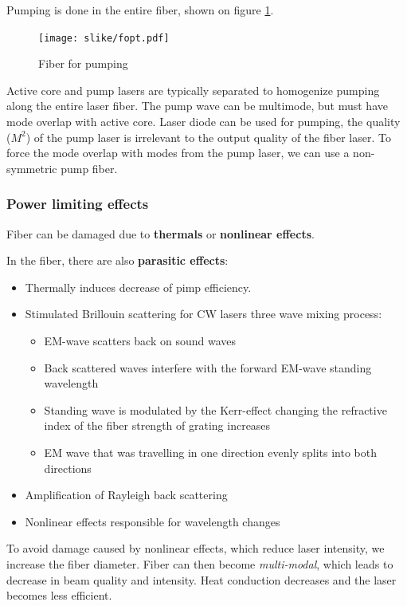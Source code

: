 Pumping is done in the entire fiber, shown on figure \ref{fig:ofib}. 
\begin{figure}[h!]
    \centering
    \texttt{[image: slike/fopt.pdf]}
    \caption{Fiber for pumping}
    \label{fig:ofib}
\end{figure}

Active core and pump lasers are typically separated to homogenize pumping along the entire laser fiber.
The pump wave can be multimode, but must have mode overlap with active core. Laser diode can be used for pumping, the quality ($M^2$) of the pump laser 
is irrelevant to the output quality of the fiber laser. To force the mode overlap with modes from the pump laser, we can
use a non-symmetric pump fiber. 

\subsubsection{Power limiting effects}
Fiber can be damaged due to \textbf{thermals} or \textbf{nonlinear effects}.

In the fiber, there are also \textbf{parasitic effects}:
\begin{itemize}
    \item Thermally induces decrease of pimp efficiency.
    \item Stimulated Brillouin scattering for CW lasers \pd three wave mixing process:
    \begin{itemize}
        \item EM-wave scatters back on sound waves
        \item Back scattered waves interfere with the forward EM-wave \pd standing wavelength
        \item Standing wave is modulated by the Kerr-effect changing the refractive index of the fiber \pd strength of grating increases
        \item EM wave that was travelling in one direction evenly splits into both directions
    \end{itemize}
    \item Amplification of Rayleigh back scattering
    \item Nonlinear effects responsible for wavelength changes
\end{itemize}


To avoid damage caused by nonlinear effects, which reduce laser intensity, we increase the fiber diameter. 
Fiber can then become \textit{multi-modal}, which leads to decrease in beam quality and intensity.
Heat conduction decreases and the laser becomes less efficient.

